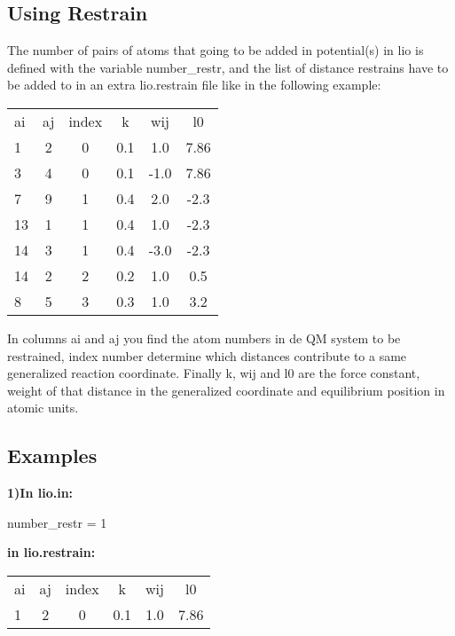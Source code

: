 \documentclass[journal=jctcce,manuscript=article]{achemso}
\begin{document}
    

    \subsection{Using Restrain}

    The number of pairs of atoms that going to be added in potential(s) in lio is defined with the variable number\_restr, and the list of distance restrains have to be added to in an extra lio.restrain file like in the following example:

    \begin{table}  [H]
      \begin{center}
      \begin{tabular}{ l c c c c c} 
         ai & aj & index &   k  &    wij   &  l0    \\
         1  &  2 &   0   &  0.1 &    1.0   & 7.86   \\
         3  &  4 &   0   &  0.1 &   -1.0   & 7.86   \\
         7  &  9 &   1   &  0.4 &    2.0   & -2.3   \\
         13 &  1 &   1   &  0.4 &    1.0   & -2.3   \\
         14 &  3 &   1   &  0.4 &   -3.0   & -2.3   \\
         14 &  2 &   2   &  0.2 &    1.0   & 0.5    \\
         8  &  5 &   3   &  0.3 &    1.0   & 3.2    \\
       \end{tabular}
       \end{center}
      \label{lio.restrain}
    \end{table}

In columns ai and aj you find the atom numbers in de QM system to be restrained, index number determine which distances contribute to a same generalized reaction coordinate. Finally k, wij and l0 are the force constant, weight of that distance in the generalized coordinate and equilibrium position in atomic units.
    
    \subsection{Examples}

    \textbf{1)In lio.in:}
    
    number\_restr = 1
    
    \textbf{in lio.restrain:}
    
    \begin{table}  [H]
      \begin{center}
      \begin{tabular}{ l c c c c c} 
         ai & aj & index &   k  &    wij   &  l0    \\
         1  &  2 &   0   &  0.1 &    1.0   & 7.86   \\
       \end{tabular}
       \end{center}
      \label{Tex1}
    \end{table}
\end{document}
